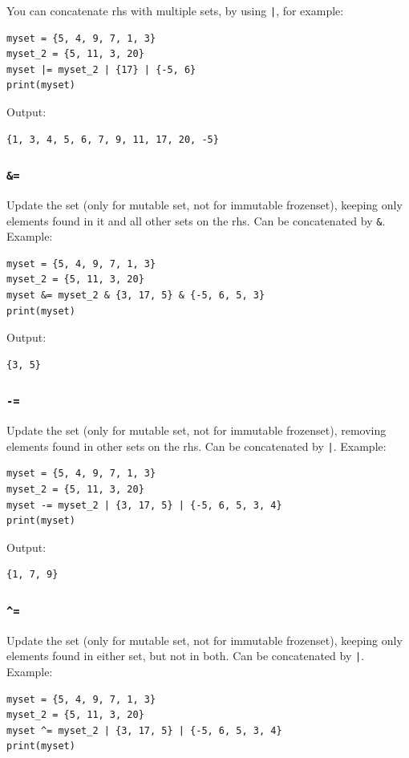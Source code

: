 \documentclass[12pt]{book}
\begin{document}
You can concatenate rhs with multiple sets, by using \texttt{|}, for example:
\begin{verbatim}
myset = {5, 4, 9, 7, 1, 3}
myset_2 = {5, 11, 3, 20}
myset |= myset_2 | {17} | {-5, 6}
print(myset)
\end{verbatim}
Output:
\begin{verbatim}
{1, 3, 4, 5, 6, 7, 9, 11, 17, 20, -5}
\end{verbatim}

\subsubsection{\texttt{\&=}}
\label{sec:orge53f05b}
Update the set (only for mutable set, not for immutable frozenset), keeping only elements found in it and all other sets on the rhs. Can be concatenated by \texttt{\&}. Example:
\begin{verbatim}
myset = {5, 4, 9, 7, 1, 3}
myset_2 = {5, 11, 3, 20}
myset &= myset_2 & {3, 17, 5} & {-5, 6, 5, 3}
print(myset)
\end{verbatim}
Output:
\begin{verbatim}
{3, 5}
\end{verbatim}

\subsubsection{\texttt{-=}}
\label{sec:org5618c72}
Update the set (only for mutable set, not for immutable frozenset), removing elements found in other sets on the rhs. Can be concatenated by \texttt{|}. Example:
\begin{verbatim}
myset = {5, 4, 9, 7, 1, 3}
myset_2 = {5, 11, 3, 20}
myset -= myset_2 | {3, 17, 5} | {-5, 6, 5, 3, 4}
print(myset)
\end{verbatim}
Output:
\begin{verbatim}
{1, 7, 9}
\end{verbatim}

\subsubsection{\texttt{\textasciicircum{}=}}
\label{sec:org9c25fef}
Update the set (only for mutable set, not for immutable frozenset), keeping only elements found in either set, but not in both. Can be concatenated by \texttt{|}. Example:
\begin{verbatim}
myset = {5, 4, 9, 7, 1, 3}
myset_2 = {5, 11, 3, 20}
myset ^= myset_2 | {3, 17, 5} | {-5, 6, 5, 3, 4}
print(myset)
\end{verbatim}
\end{document}
